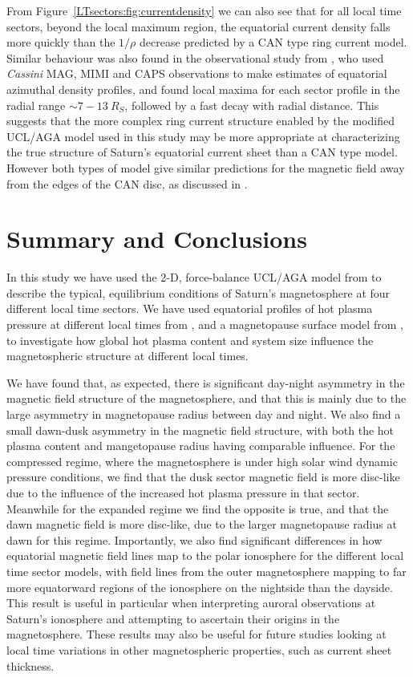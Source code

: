 From Figure~\ref{LTsectors:fig:currentdensity} we can also see that for all local time sectors, beyond the local maximum region, the equatorial current density falls more quickly than the $1/\rho$ decrease predicted by a CAN type ring current model. Similar behaviour was also found in the observational study from \citet{sergis2017}, who used \textit{Cassini} MAG, MIMI and CAPS observations to make estimates of equatorial azimuthal density profiles, and found local maxima for each sector profile in the radial range ${\sim}7-\SI{13}{R_S}$, followed by a fast decay with radial distance. This suggests that the more complex ring current structure enabled by the modified UCL/AGA model used in this study may be more appropriate at characterizing the true structure of Saturn's equatorial current sheet than a CAN type model. However both types of model give similar predictions for the magnetic field away from the edges of the CAN disc, as discussed in \citet{achilleos2010a}.

\section{Summary and Conclusions} \label{LTsectors:sec:conclusions}
In this study we have used the 2-D, force-balance UCL/AGA model from \citet{achilleos2010a} to describe the typical, equilibrium conditions of Saturn's magnetosphere at four different local time sectors. We have used equatorial profiles of hot plasma pressure at different local times from \citet{sergis2017}, and a magnetopause surface model from \citet{pilkington2015b}, to investigate how global hot plasma content and system size influence the magnetospheric structure at different local times.

We have found that, as expected, there is significant day-night asymmetry in the magnetic field structure of the magnetosphere, and that this is mainly due to the large asymmetry in magnetopause radius between day and night. We also find a small dawn-dusk asymmetry in the magnetic field structure, with both the hot plasma content and mangetopause radius having comparable influence. For the compressed regime, where the magnetosphere is under high solar wind dynamic pressure conditions, we find that the dusk sector magnetic field is more disc-like due to the influence of the increased hot plasma pressure in that sector. Meanwhile for the expanded regime we find the opposite is true, and that the dawn magnetic field is more disc-like, due to the larger magnetopause radius at dawn for this regime. Importantly, we also find significant differences in how equatorial magnetic field lines map to the polar ionosphere for the different local time sector models, with field lines from the outer magnetosphere mapping to far more equatorward regions of the ionosphere on the nightside than the dayside. This result is useful in particular when interpreting auroral observations at Saturn's ionosphere and attempting to ascertain their origins in the magnetosphere. These results may also be useful for future studies looking at local time variations in other magnetospheric properties, such as current sheet thickness.

